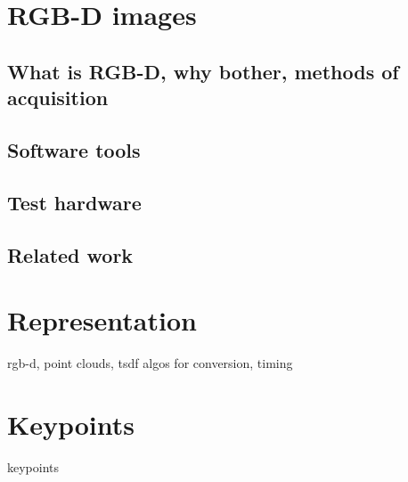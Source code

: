 \chapter{RGB-D images}
\label{cha:chap1}


\section{What is RGB-D, why bother, methods of acquisition}
\label{sec:motivation}


\section{Software tools}
\label{sec:software}


\section{Test hardware}
\label{sec:testhardware}


\section{Related work}
\label{sec:relatedWork}


\chapter{Representation}
\label{cha:representation}

rgb-d, point clouds, tsdf
algos for conversion, timing


\chapter{Keypoints}
\label{cha:keypoints}

keypoints

